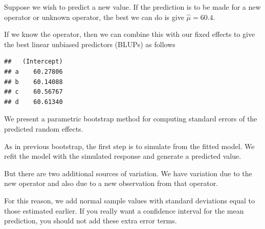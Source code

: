 \documentclass[
  ignorenonframetext,
]{beamer}
\newenvironment{Shaded}{\begin{snugshade}}{\end{snugshade}}
\newcommand{\FunctionTok}[1]{\textcolor[rgb]{0.00,0.00,0.00}{#1}}
\newcommand{\NormalTok}[1]{#1}
\newcommand{\SpecialCharTok}[1]{\textcolor[rgb]{0.00,0.00,0.00}{#1}}
\begin{document}
\begin{frame}[fragile]{}
\protect\hypertarget{section-11}{}
Suppose we wish to predict a new value. If the prediction is to be made
for a new operator or unknown operator, the best we can do is give
\(\hat\mu = 60.4\).

If we know the operator, then we can combine this with our fixed effects
to give the best linear unbiased predictors (BLUPs) as follows

\vspace{12pt}

\begin{Shaded}
\end{Shaded}

\begin{verbatim}
##   (Intercept)
## a    60.27806
## b    60.14088
## c    60.56767
## d    60.61340
\end{verbatim}
\end{frame}

\begin{frame}{}
\protect\hypertarget{section-12}{}
We present a parametric bootstrap method for computing standard errors
of the predicted random effects.

As in previous bootstrap, the first step is to simulate from the fitted
model. We refit the model with the simulated response and generate a
predicted value.

But there are two additional sources of variation. We have variation due
to the new operator and also due to a new observation from that
operator.

For this reason, we add normal sample values with standard deviations
equal to those estimated earlier. If you really want a confidence
interval for the mean prediction, you should not add these extra error
terms.
\end{frame}
\end{document}
